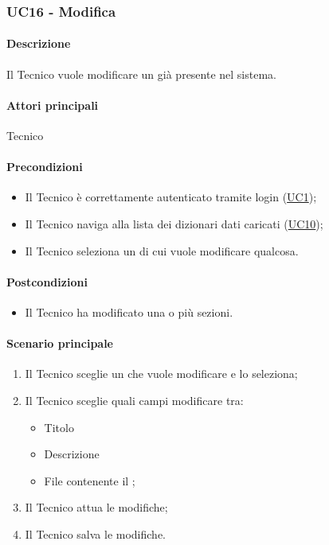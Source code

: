 \subsubsection{UC16 - Modifica }\label{UC16}
\paragraph*{Descrizione}
Il Tecnico vuole modificare un  già presente nel sistema.


\paragraph*{Attori principali}
Tecnico

\paragraph*{Precondizioni}
\begin{itemize}
  \item Il Tecnico è correttamente autenticato tramite login (\hyperref[UC1]{UC1});
  \item Il Tecnico naviga alla lista dei dizionari dati caricati (\hyperref[UC10]{UC10});
  \item Il Tecnico seleziona un  di cui vuole modificare qualcosa.
\end{itemize}

\paragraph*{Postcondizioni}
\begin{itemize}
  \item Il Tecnico ha modificato una o più sezioni.
\end{itemize}

\paragraph*{Scenario principale}
\begin{enumerate}
  \item Il Tecnico sceglie un  che vuole modificare e lo seleziona;
  \item Il Tecnico sceglie quali campi modificare tra:
  \begin{itemize}
    \item Titolo
    \item Descrizione 
    \item File contenente il ;
  \end{itemize}
  \item Il Tecnico attua le modifiche;
  \item Il Tecnico salva le modifiche.
\end{enumerate}

